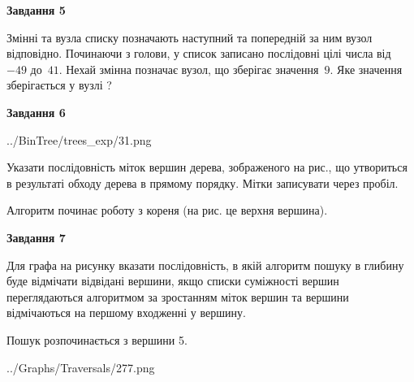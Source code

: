 \documentclass[12pt, ukrainian]{article}
\begin{document}
{\begin {large}
{\begin {center}\textbf{Завдання 5}\end {center}}\par
Змінні  та  вузла списку позначають наступний та попередній за ним вузол відповідно. Починаючи з голови, у список записано послідовні цілі числа від~$-49$ до~$41$. Нехай змінна  позначає вузол, що зберігає значення~$9$.
Яке значення зберігається у вузлі  ?\par
\newpage

{\begin {center}\textbf{Завдання 6}\end {center}}\par

\begin{center}
	{../BinTree/trees_exp/31.png}
\end{center}
Указати послідовність міток вершин дерева, зображеного на рис., що утвориться в результаті обходу дерева в прямому порядку. Мітки записувати через пробіл.\par Алгоритм починає роботу з кореня (на рис. це верхня вершина).\par
\newpage

{\begin {center}\textbf{Завдання 7}\end {center}}\par
Для графа на рисунку вказати послідовність, в якій алгоритм пошуку в глибину буде відмічати відвідані вершини, якщо списки суміжності вершин переглядаються алгоритмом за зростанням міток вершин та вершини відмічаються на першому вход\-женні у вершину.\par
Пошук розпочинається з вершини 5.\par

\begin{center}
	{../Graphs/Traversals/277.png}
\end{center}\par
\newpage


\end{large}}
\end{document}
